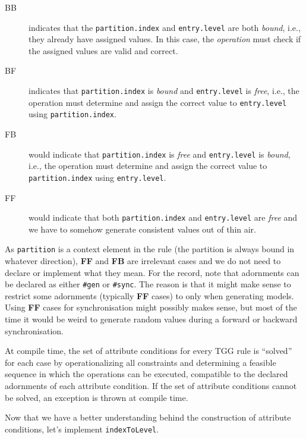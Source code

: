 \begin{description}

\item[BB] indicates that the \texttt{partition.index} and \texttt{entry.level} are both \emph{bound}, i.e., they already have assigned values.
In this case, the \emph{operation} must check if the assigned values are valid and correct.

\item[BF] indicates that \texttt{partition.index} is \emph{bound} and \texttt{entry.level} is \emph{free}, i.e., the operation must determine and assign the correct value to \texttt{entry.level} using \texttt{partition.index}.

\item[FB] would indicate that \texttt{partition.index} is \emph{free} and \texttt{entry.level} is \emph{bound}, i.e., the operation must determine and assign the correct value to \texttt{parti\-tion.in\-dex} using \texttt{entry.level}.

\item[FF] would indicate that both \texttt{partition.index} and \texttt{entry.level} are \emph{free} and we have to somehow generate consistent values out of thin air.

\end{description}

As \texttt{partition} is a context element in the rule (the partition is always bound in whatever direction), \textbf{FF} and \textbf{FB} are irrelevant cases and we do not need to declare or implement what they mean.
For the record, note that adornments can be declared as either \texttt{\#gen} or \texttt{\#sync}.
The reason is that it might make sense to restrict some adornments (typically \textbf{FF} cases) to only when generating models.
Using \textbf{FF} cases for synchronisation might possibly makes sense, but most of the time it would be weird to generate random values during a forward or backward synchronisation.  

At compile time, the set of attribute conditions for every TGG rule is ``solved'' for each case by
operationalizing all constraints and determining a feasible sequence in which the operations can be executed, compatible to the declared adornments of each attribute condition. 
If the set of attribute conditions cannot be solved, an exception is thrown at compile time.

Now that we have a better understanding behind the construction of attribute conditions, let's implement \texttt{indexToLevel}.

